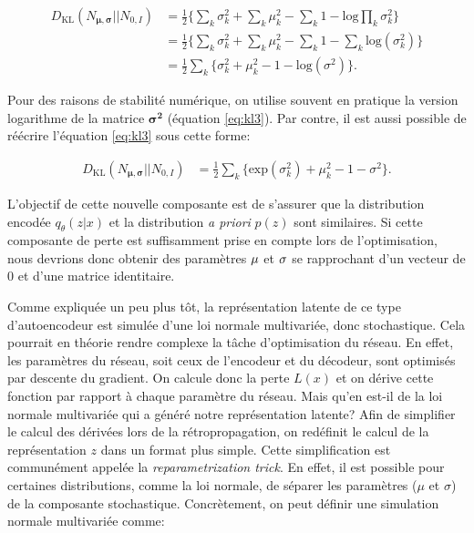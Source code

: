 \begin{equation}  \label{eq:kl3}
\begin{aligned}
D_{\text{KL}}(N_{\boldsymbol \mu, \boldsymbol \sigma} || N_{0,I}) &=  \frac{1}{2}\Big\{\sum_k \sigma_{k}^2+ \sum_{k}\mu_{k}^2 - \sum_{k} 1 - \text{log} \prod_{k}\sigma_{k}^2\Big \} \\
&=\frac{1}{2}\Big\{\sum_k \sigma_{k}^2+ \sum_{k}\mu_{k}^2 - \sum_{k} 1 - \sum_{k} \text{log} (\sigma_{k}^2)\Big \} \\
&=\frac{1}{2} \sum_{k}\Big\{\sigma_{k}^2 + \mu_{k}^2 - 1 - \text{log}(\sigma^2)\Big\}.
\end{aligned}
\end{equation}

Pour des raisons de stabilité numérique, on utilise souvent en pratique la version logarithme de la matrice $\boldsymbol{\sigma^2}$ (équation \ref{eq:kl3}). Par contre, il est aussi possible de réécrire l'équation \ref{eq:kl3} sous cette forme:

\begin{equation}  \label{eq:kl4}
\begin{aligned}
D_{\text{KL}}(N_{\boldsymbol \mu, \boldsymbol \sigma} || N_{0,I}) &= \frac{1}{2} \sum_{k}\Big\{\text{exp}(\sigma_{k}^2) + \mu_{k}^2 - 1 - \sigma^2\Big\}.
\end{aligned}
\end{equation}


 L'objectif de cette nouvelle composante est de s'assurer que la distribution encodée $q_{\theta}(z|x)$ et la distribution \textit{a priori} $p(z)$ sont similaires. Si cette composante de perte est suffisamment prise en compte lors de l'optimisation, nous devrions donc obtenir des paramètres $\boldmath \mu$ et $\boldmath \sigma$ se rapprochant d'un vecteur de 0 et d'une matrice identitaire. 

Comme expliquée un peu plus tôt, la représentation latente de ce type d'autoencodeur est simulée d'une loi normale multivariée, donc stochastique. Cela pourrait en théorie rendre complexe la tâche d'optimisation du réseau. En effet, les paramètres du réseau, soit ceux de l'encodeur et du décodeur, sont optimisés par descente du gradient. On calcule donc la perte $L(x)$ et on dérive cette fonction par rapport à chaque paramètre du réseau. Mais qu'en est-il de la loi normale multivariée qui a généré notre représentation latente? Afin de simplifier le calcul des dérivées lors de la rétropropagation, on redéfinit le calcul de la représentation $z$ dans un format plus simple. Cette simplification est communément appelée la  \textit{reparametrization trick}. En effet, il est possible pour certaines distributions, comme la loi normale, de séparer les paramètres ($\mu$ et $\sigma$)  de la composante stochastique. Concrètement, on peut définir une simulation normale multivariée comme:

